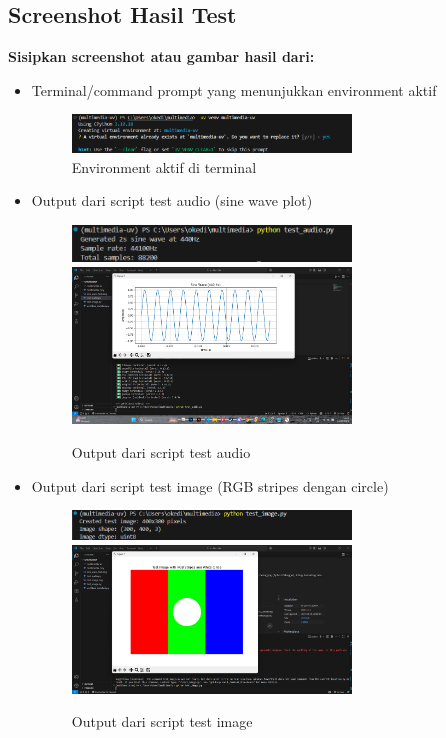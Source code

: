 \documentclass[11pt,a4paper]{article}
\begin{document}
\subsection{Screenshot Hasil Test}
\textbf{Sisipkan screenshot atau gambar hasil dari:}
\begin{itemize}
    \item Terminal/command prompt yang menunjukkan environment aktif
    \begin{figure}[H]
        \centering
        \includegraphics[width=0.7\textwidth]{Figure/ss1.png}
        \caption{Environment aktif di terminal}
        \label{fig:env_aktif}
    \end{figure}
    \item Output dari script test audio (sine wave plot)
    \begin{figure}[H]
        \centering
        \includegraphics[width=0.7\textwidth]{Figure/ss7.png}
        \includegraphics[width=0.7\textwidth]{Figure/ss8.png}
        \caption{Output dari script test audio}
        \label{fig:contoh-gambar}
    \end{figure}
    \item Output dari script test image (RGB stripes dengan circle)
    \begin{figure}[H]
        \centering
        \includegraphics[width=0.7\textwidth]{Figure/ss9.png}
        \includegraphics[width=0.7\textwidth]{Figure/ss10.png}
        \caption{Output dari script test image}
        \label{fig:contoh-gambar}
    \end{figure}
\end{itemize}
\end{document}
